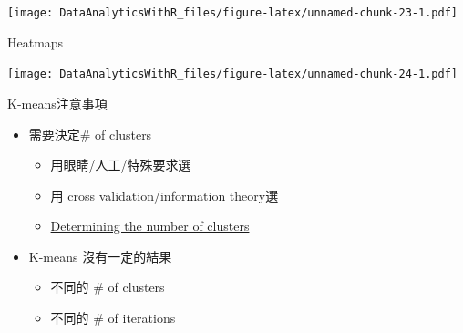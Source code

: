 \documentclass[
]{book}
\newenvironment{Shaded}{\begin{snugshade}}{\end{snugshade}}
\newcommand{\DataTypeTok}[1]{\textcolor[rgb]{0.13,0.29,0.53}{#1}}
\newcommand{\DecValTok}[1]{\textcolor[rgb]{0.00,0.00,0.81}{#1}}
\newcommand{\FloatTok}[1]{\textcolor[rgb]{0.00,0.00,0.81}{#1}}
\newcommand{\KeywordTok}[1]{\textcolor[rgb]{0.13,0.29,0.53}{\textbf{#1}}}
\newcommand{\NormalTok}[1]{#1}
\newcommand{\OperatorTok}[1]{\textcolor[rgb]{0.81,0.36,0.00}{\textbf{#1}}}
\newcommand{\StringTok}[1]{\textcolor[rgb]{0.31,0.60,0.02}{#1}}
\providecommand{\tightlist}{%
  \setlength{\itemsep}{0pt}\setlength{\parskip}{0pt}}
\begin{document}
\texttt{[image: DataAnalyticsWithR\_files/figure-latex/unnamed-chunk-23-1.pdf]}

Heatmaps

\begin{Shaded}
\end{Shaded}

\texttt{[image: DataAnalyticsWithR\_files/figure-latex/unnamed-chunk-24-1.pdf]}

K-means注意事項

\begin{itemize}
\tightlist
\item
  需要決定\# of clusters

  \begin{itemize}
  \tightlist
  \item
    用眼睛/人工/特殊要求選
  \item
    用 cross validation/information theory選
  \item
    \href{http://en.wikipedia.org/wiki/Determining_the_number_of_clusters_in_a_data_set}{Determining the number of clusters}
  \end{itemize}
\item
  K-means 沒有一定的結果

  \begin{itemize}
  \tightlist
  \item
    不同的 \# of clusters
  \item
    不同的 \# of iterations
  \end{itemize}
\end{itemize}
\end{document}
